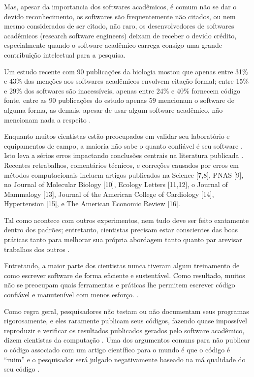 Mas, apesar da importancia dos softwares acadêmicos, é comum não se dar o
devido reconhecimento, os softwares são frequentemente não citados, ou nem
mesmo considerados de ser citado, não raro, os desenvolvedores de softwares
acadêmicos (research software engineers) deixam de receber o devido crédito,
especialmente quando o software acadêmico carrega consigo uma grande
contribuição intelectual para a pesquisa.

Um estudo recente com 90 publicações da biologia mostou que apenas entre 31\% e
43\% das menções aos softwares acadêmicos envolvem citação formal; entre 15\% e
29\% dos softwares são inacessíveis, apenas entre 24\% e 40\% fornecem código
fonte, entre as 90 publicações do estudo apenas 59 mencionam o software de
alguma forma, as demais, apesar de usar algum software acadêmico, não mencionam
nada a respeito \cite{howison2016software}.

Enquanto muitos cientistas estão preocupados em validar seu
laboratório e equipamentos de campo, a maioria não sabe o quanto confiável é
seu software \cite{Vardi_2010_SOT_1810891.1810892} \cite{10.1109_32.328993}
\cite{Hatton1997}. Isto leva a sérios erros impactando conclusões centrais na
literatura publicada \cite{Merali2010Computational}. Recentes retrabalhos, comentários
técnicos, e correções causados por erros em métodos computacionais incluem
artigos publicados na Science [7,8], PNAS [9], no Journal of Molecular Biology
[10], Ecology Letters [11,12], o Journal of Mammalogy [13], Journal of the
American College of Cardiology [14], Hypertension [15], e The American Economic
Review [16].

Tal como acontece com outros experimentos, nem tudo deve ser feito
exatamente dentro dos padrões; entretanto, cientistas precisam estar
conscientes das boas práticas tanto para melhorar sua própria abordagem
tanto quanto par arevisar trabalhos dos outros \cite{wilson2014best}.

Entretando, a maior parte dos cientistas nunca tiveram algum treinamento
de como escrever software de forma eficiente e sustentável. Como resultado,
muitos não se preocupam quais ferramentas e práticas lhe permitem escrever código
confiável e manutenível com menos esforço.
\cite{wilson2014best}.

Como regra geral, pesquisadores não testam ou não documentam seus programas
rigorosamente, e eles raramente publicam seus códigos, fazendo quase impossível
reproduzir e verificar os resultados publicados gerados pelo software
acadêmico, dizem cientistas da computação \cite{Merali2010Computational}. Uma
dos argumentos comuns para não publicar o código associado com um artigo científico
para o mundo é que o código é ``ruim'' e o pesquisador será julgado negativamente baseado
na má qualidade do seu código \cite{allen2017engineering}.

